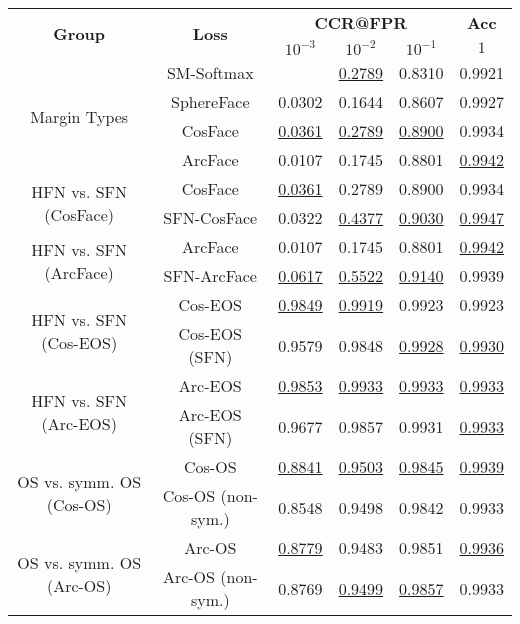 \begin{tabularx}{.7\textwidth}{|c|c||ccc|c|}
\cline{1-6}
\multirow{2}{*}{\bf Group} & \multirow{2}{*}{\bf Loss} & \multicolumn{3}{c|}{\bf CCR@FPR} & \bf {Acc} \\ \cline{3-6}
& &$10^{-3}$ & $10^{-2}$ & $10^{-1}$ & $1$\\\cline{1-6}\cline{1-6}
\multirow{4}{*}{Margin Types} & SM-Softmax & & \underline {0.2789} & 0.8310 & 0.9921\\
 & SphereFace & 0.0302 & 0.1644 & 0.8607 & 0.9927\\
 & CosFace & \underline {0.0361} & \underline {0.2789} & \underline {0.8900} & 0.9934\\
 & ArcFace & 0.0107 & 0.1745 & 0.8801 & \underline {0.9942}\\
\cline{1-6}
\multirow{2}{*}{HFN vs. SFN (CosFace)} & CosFace & \underline {0.0361} & 0.2789 & 0.8900 & 0.9934\\
 & SFN-CosFace & 0.0322 & \underline {0.4377} & \underline {0.9030} & \underline {0.9947}\\
\cline{1-6}
\multirow{2}{*}{HFN vs. SFN (ArcFace)} & ArcFace & 0.0107 & 0.1745 & 0.8801 & \underline {0.9942}\\
 & SFN-ArcFace & \underline {0.0617} & \underline {0.5522} & \underline {0.9140} & 0.9939\\
\cline{1-6}
\multirow{2}{*}{HFN vs. SFN (Cos-EOS)} & Cos-EOS & \underline {0.9849} & \underline {0.9919} & 0.9923 & 0.9923\\
 & Cos-EOS (SFN) & 0.9579 & 0.9848 & \underline {0.9928} & \underline {0.9930}\\
\cline{1-6}
\multirow{2}{*}{HFN vs. SFN (Arc-EOS)} & Arc-EOS & \underline {0.9853} & \underline {0.9933} & \underline {0.9933} & \underline {0.9933}\\
 & Arc-EOS (SFN) & 0.9677 & 0.9857 & 0.9931 & \underline {0.9933}\\
\cline{1-6}
\multirow{2}{*}{OS vs. symm. OS (Cos-OS)} & Cos-OS & \underline {0.8841} & \underline {0.9503} & \underline {0.9845} & \underline {0.9939}\\
 & Cos-OS (non-sym.) & 0.8548 & 0.9498 & 0.9842 & 0.9933\\
\cline{1-6}
\multirow{2}{*}{OS vs. symm. OS (Arc-OS)} & Arc-OS & \underline {0.8779} & 0.9483 & 0.9851 & \underline {0.9936}\\
 & Arc-OS (non-sym.) & 0.8769 & \underline {0.9499} & \underline {0.9857} & 0.9933\\
\cline{1-6}
\end{tabularx}
